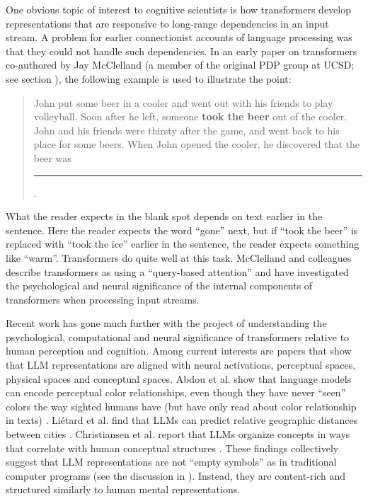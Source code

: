 One obvious topic of interest to cognitive scientists is how transformers develop representations that are responsive to long-range dependencies in an input stream. A problem for earlier connectionist accounts of language processing was that they could not handle such dependencies. In an early paper on transformers co-authored by Jay McClelland  \cite{mcclelland2020placing} (a member of the original PDP group at UCSD; see section ), the following example is used to illustrate the point:
\begin{quote}
John put some beer in a cooler and went out with his friends to play volleyball. Soon after he left, someone \textbf{took the beer} out of the cooler. John and his friends were thirsty after the game, and went back to his place for some beers. When John opened the cooler, he discovered that the beer was \rule{1cm}{0.15mm}.
\end{quote}
What the reader expects in the blank spot depends on text earlier in the sentence. Here the reader expects the word ``gone'' next, but if ``took the beer'' is replaced with ``took the ice'' earlier in the sentence, the reader expects something like ``warm''. Transformers do quite well at this task. McClelland and colleagues describe transformers as using a ``query-based attention''  and have investigated the psychological and neural significance of the internal components of transformers when processing input streams. 

Recent work has gone much further with the project of understanding the psychological, computational and neural significance of transformers relative to human perception and cognition. Among current interests are papers that show that LLM representations are aligned with neural activations,  perceptual spaces, physical spaces and conceptual spaces. Abdou et al. show that language models can encode perceptual color relationships, even though they have never ``seen'' colors the way sighted humans have (but have only read about color relationship in texts) \cite{abdou2021can}. Liétard et al. find that LLMs can predict relative geographic distances between cities \cite{lietard2021do}. Christiansen et al. report that LLMs organize concepts in ways that correlate with human conceptual structures \cite{christiansen2023large}. These findings collectively suggest that LLM representations are not ``empty symbols'' as in traditional computer programs (see the discussion in ). Instead, they are content-rich and structured similarly to human mental representations.

